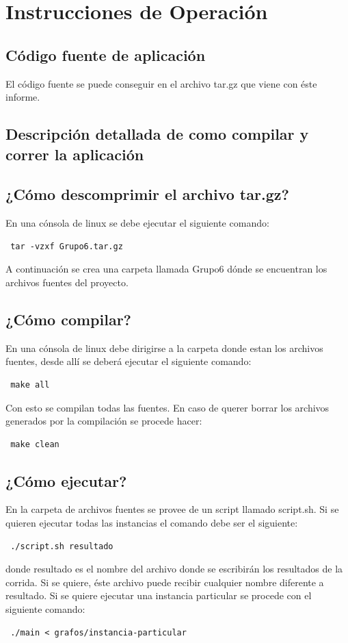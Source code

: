 \documentclass[a4paper,10pt]{article}
\begin{document}
\section{Instrucciones de Operación}

\subsection{Código fuente de aplicación}
El código fuente se puede conseguir en el archivo tar.gz que viene con éste informe.

\subsection{Descripción detallada de como compilar y correr la aplicación}

\subsection{¿Cómo descomprimir el archivo tar.gz?}
En una cónsola de linux se debe ejecutar el siguiente comando:
\begin{verbatim}
 tar -vzxf Grupo6.tar.gz
\end{verbatim}
A continuación se crea una carpeta llamada Grupo6 dónde se encuentran los archivos fuentes del proyecto.

\subsection{¿Cómo compilar?}
En una cónsola de linux debe dirigirse a la carpeta donde estan los archivos fuentes, desde allí se deberá ejecutar
el siguiente comando:
\begin{verbatim}
 make all
\end{verbatim}
Con esto se compilan todas las fuentes. En caso de querer borrar los archivos generados por la compilación se procede hacer:
\begin{verbatim}
 make clean
\end{verbatim}

\subsection{¿Cómo ejecutar?}
En la carpeta de archivos fuentes se provee de un script llamado script.sh. Si se quieren ejecutar todas las instancias 
el comando debe ser el siguiente:
\begin{verbatim}
 ./script.sh resultado
\end{verbatim}
donde resultado es el nombre del archivo donde se escribirán los resultados de la corrida. Si se quiere, éste archivo puede recibir cualquier nombre diferente a resultado.
Si se quiere ejecutar una instancia particular se procede con el siguiente comando:
\begin{verbatim}
 ./main < grafos/instancia-particular
\end{verbatim}
\newpage
\end{document}
